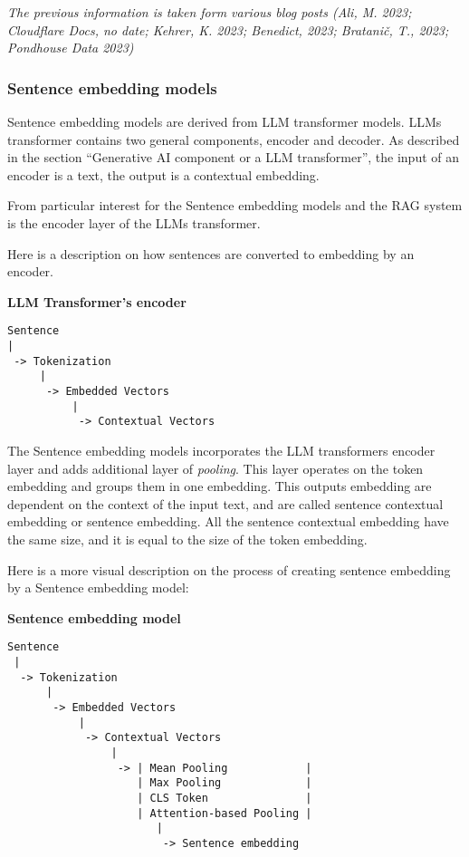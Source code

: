 \documentclass{wseas}
\begin{document}
\emph{The previous information is taken form various blog posts (Ali, M.
2023; Cloudflare Docs, no date; Kehrer, K. 2023; Benedict, 2023;
Bratanič, T., 2023; Pondhouse Data 2023)} \cite{cite9} \cite{cite10} \cite{cite11} 
\cite{cite12} \cite{cite13} \cite{cite14} \cite{cite15} \cite{cite16}

\subsubsection{Sentence embedding models}

Sentence embedding models are derived from LLM transformer models. LLMs
transformer contains two general components, encoder and decoder. As
described in the section ``Generative AI component or a LLM
transformer'', the input of an encoder is a text, the output is a
contextual embedding.

From particular interest for the Sentence embedding models and the RAG
system is the encoder layer of the LLMs transformer.

Here is a description on how sentences are converted to embedding by an
encoder.

\textbf{LLM Transformer's encoder}

\begin{verbatim}
Sentence
|
 -> Tokenization
     |
      -> Embedded Vectors
          |
           -> Contextual Vectors
\end{verbatim}

The Sentence embedding models incorporates the LLM transformers encoder
layer and adds additional layer of \emph{pooling}. This layer operates
on the token embedding and groups them in one embedding. This outputs
embedding are dependent on the context of the input text, and are called
sentence contextual embedding or sentence embedding. All the sentence
contextual embedding have the same size, and it is equal to the size of
the token embedding.


Here is a more visual description on the process of creating sentence
embedding by a Sentence embedding model:

\textbf{Sentence embedding model}

\begin{verbatim}
Sentence 
 |
  -> Tokenization
      | 
       -> Embedded Vectors
           | 
            -> Contextual Vectors
                | 
                 -> | Mean Pooling            |  
                    | Max Pooling             | 
                    | CLS Token               |
                    | Attention-based Pooling |
                       | 
                        -> Sentence embedding
\end{verbatim}
\end{document}
